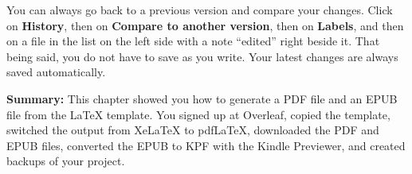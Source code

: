 You can always go back to a previous version and compare your changes. Click on \textbf{History}, then on \textbf{Compare to another version}, then on \textbf{Labels}, and then on a file in the list on the left side with a note ``edited'' right beside it. That being said, you do not have to save as you write. Your latest changes are always saved automatically. 

\textbf{Summary:} This chapter showed you how to generate a PDF file and an EPUB file from the LaTeX template. You signed up at Overleaf, copied the template, switched the output from XeLaTeX to pdfLaTeX, downloaded the PDF and EPUB files, converted the EPUB to KPF with the Kindle Previewer, and created backups of your project.